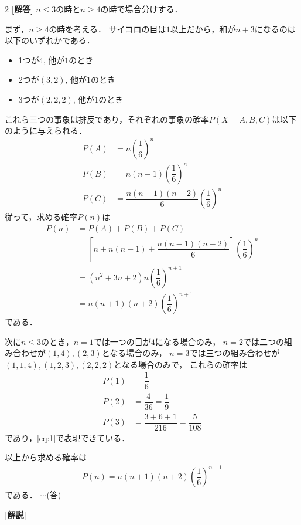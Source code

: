 \documentclass[../../main.tex]{subfiles}
\begin{document}
\setcounter{equation}{0}
\begin{oframed}
  
\end{oframed}
\setlength{\columnseprule}{0.4pt}
\begin{multicols}{2}
  {\bf [解答]}
  $n \le 3$の時と$n \ge 4$の時で場合分けする．

  まず，$n \ge 4$の時を考える．
  サイコロの目は$1$以上だから，和が$n+3$になるのは以下のいずれかである．
  \begin{itemize}
    \item[A] 1つが$4$, 他が$1$のとき
    \item[B] 2つが$(3,2)$, 他が$1$のとき
    \item[C] 3つが$(2,2,2)$, 他が$1$のとき
  \end{itemize}
  これら三つの事象は排反であり，それぞれの事象の確率$P(X=A,B,C)$は以下のように与えられる．
  \begin{align}
    P(A) & = n\left(\dfrac{1}{6}\right)^n                     \\
    P(B) & = n(n-1)\left(\dfrac{1}{6}\right)^n                \\
    P(C) & = \dfrac{n(n-1)(n-2)}{6}\left(\dfrac{1}{6}\right)^n
  \end{align}
  従って，求める確率$P(n)$は
  \begin{align}
    P(n)
    & = P(A)+P(B)+P(C)                                                             \\
    & = \left[n + n(n-1) + \dfrac{n(n-1)(n-2)}{6}\right] \left(\dfrac{1}{6}\right)^n \\
    & = \left(n^2 + 3n + 2\right) n \left(\dfrac{1}{6}\right)^{n+1}                 \\
    & = n(n+1)(n+2) \left(\dfrac{1}{6}\right)^{n+1} \label{eq:1}
  \end{align}
  である．

  次に$n \le 3$のとき，$n=1$では一つの目が$4$になる場合のみ，
  $n=2$では二つの組み合わせが$(1,4),(2,3)$となる場合のみ，
  $n=3$では三つの組み合わせが$(1,1,4),(1,2,3),(2,2,2)$となる場合のみで，
  これらの確率は
  \begin{align}
    P(1) & = \dfrac{1}{6}                       \\
    P(2) & = \dfrac{4}{36} = \dfrac{1}{9}        \\
    P(3) & = \dfrac{3+6+1}{216} = \dfrac{5}{108}
  \end{align}
  であり，\cref{eq:1}で表現できている．

  以上から求める確率は
  \begin{align}
    P(n) = n(n+1)(n+2) \left(\dfrac{1}{6}\right)^{n+1}
  \end{align}
  である． $\cdots$(答)

  {\bf [解説]}

  \newpage
\end{multicols}
\end{document}
